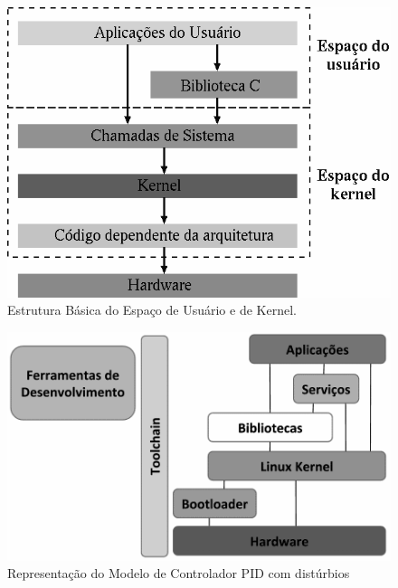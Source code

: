 \begin{figure}[htb]
  \caption{Estrutura Básica do Espaço de Usuário e de Kernel.}
  \begin{center}
      \includegraphics[scale=0.75]{img/kernel_user_space}
  \end{center}
  \label{fig:kernel_user_space}
\end{figure}
  

\begin{figure}[htb]
  \caption{Representação do Modelo de Controlador PID com distúrbios}
  \begin{center}
      \includegraphics[scale=0.35]{img/sistema-linux-overview_embarcados}
  \end{center}
  \label{fig:sistema-linux-overview_embarcados}
\end{figure}

